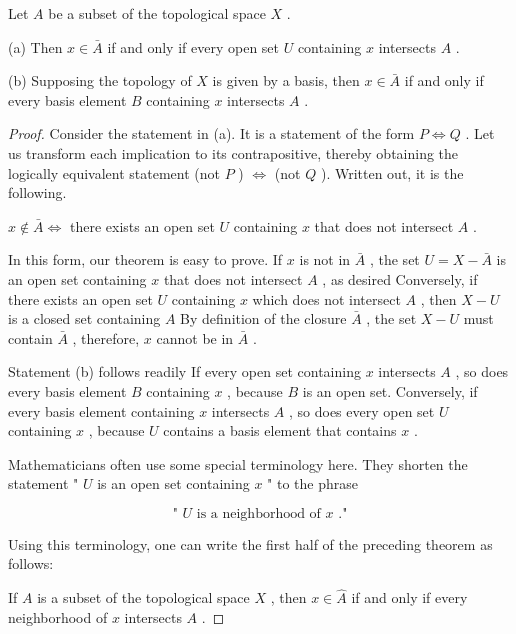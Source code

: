 \begin{theorem} Let \(A\) be a subset of the topological space \(X\) .

(a) Then \(x \in  \bar{A}\) if and only if every open set \(U\) containing \(x\) intersects \(A\) .

(b) Supposing the topology of \(X\) is given by a basis, then \(x \in  \bar{A}\) if and only if every basis element \(B\) containing \(x\) intersects \(A\) .

\end{theorem}
\begin{proof}
Consider the statement in (a). It is a statement of the form \(P \Leftrightarrow  Q\) . Let us transform each implication to its contrapositive, thereby obtaining the logically equivalent statement (not \(P\) ) \(\Leftrightarrow\) (not \(Q\) ). Written out, it is the following.

\(x \notin  \bar{A} \Leftrightarrow\) there exists an open set \(U\) containing \(x\) that does not intersect \(A\) .

In this form, our theorem is easy to prove. If \(x\) is not in \(\bar{A}\) , the set \(U = X - \bar{A}\) is an open set containing \(x\) that does not intersect \(A\) , as desired Conversely, if there exists an open set \(U\) containing \(x\) which does not intersect \(A\) , then \(X - U\) is a closed set containing \(A\) By definition of the closure \(\bar{A}\) , the set \(X - U\) must contain \(\bar{A}\) , therefore, \(x\) cannot be in \(\bar{A}\) .

Statement (b) follows readily If every open set containing \(x\) intersects \(A\) , so does every basis element \(B\) containing \(x\) , because \(B\) is an open set. Conversely, if every basis element containing \(x\) intersects \(A\) , so does every open set \(U\) containing \(x\) , because \(U\) contains a basis element that contains \(x\) .

Mathematicians often use some special terminology here. They shorten the statement " \(U\) is an open set containing \(x\) " to the phrase

\[
\text{ " }U\text{ is a neighborhood of }x\text{ ." }
\]

Using this terminology, one can write the first half of the preceding theorem as follows:

If \(A\) is a subset of the topological space \(X\) , then \(x \in  \widehat{A}\) if and only if every neighborhood of \(x\) intersects \(A\) .
\end{proof}

